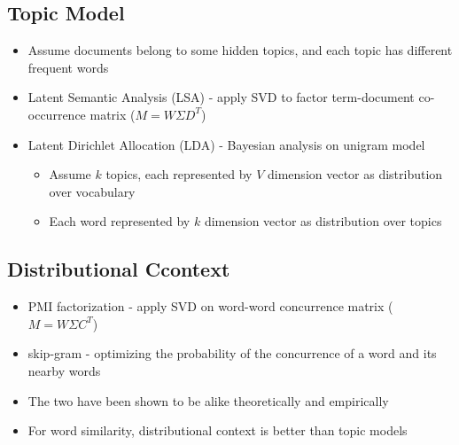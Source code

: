 \documentclass[compress]{beamer}
\begin{document}
\subsection{Topic Model}
\begin{frame}{\subsecname}
\begin{itemize}
\item Assume documents belong to some hidden topics, and each topic has different frequent words
\item Latent Semantic Analysis (LSA) - apply SVD to factor term-document co-occurrence matrix ($M=W\Sigma D^T$)
\item Latent Dirichlet Allocation (LDA) - Bayesian analysis on unigram model
\begin{itemize}
      \item Assume $k$ topics, each represented by $V$ dimension vector as distribution over vocabulary
      \item Each word represented by $k$ dimension vector as distribution over topics
\end{itemize}
\end{itemize}
\end{frame}

\subsection{Distributional Ccontext}
\begin{frame}{\subsecname}
\begin{itemize}
\item PMI factorization - apply SVD on word-word concurrence matrix ($M=W\Sigma C^T$)
\item skip-gram - optimizing the probability of the concurrence of a word and its nearby words
\item The two have been shown to be alike theoretically and empirically
\item For word similarity, distributional context is better than topic models
\end{itemize}
\end{frame}
\end{document}

